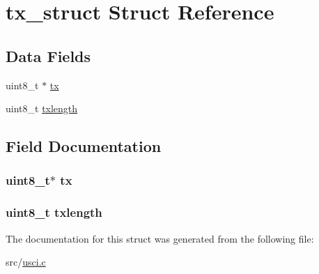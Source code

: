 \hypertarget{structtx__struct}{}\section{tx\+\_\+struct Struct Reference}
\label{structtx__struct}
\subsection*{Data Fields}
\begin{DoxyCompactItemize}
\item 
uint8\+\_\+t $\ast$ \hyperlink{structtx__struct_a9749a6866a8b0ea01498fb570e4d6b8a}{tx}
\item 
uint8\+\_\+t \hyperlink{structtx__struct_afe7c07919cd328be01c9d442f28f339e}{txlength}
\end{DoxyCompactItemize}


\subsection{Field Documentation}
\subsubsection[{\texorpdfstring{tx}{tx}}]{\setlength{\rightskip}{0pt plus 5cm}uint8\+\_\+t$\ast$ tx}\hypertarget{structtx__struct_a9749a6866a8b0ea01498fb570e4d6b8a}{}\label{structtx__struct_a9749a6866a8b0ea01498fb570e4d6b8a}
\subsubsection[{\texorpdfstring{txlength}{txlength}}]{\setlength{\rightskip}{0pt plus 5cm}uint8\+\_\+t txlength}\hypertarget{structtx__struct_afe7c07919cd328be01c9d442f28f339e}{}\label{structtx__struct_afe7c07919cd328be01c9d442f28f339e}


The documentation for this struct was generated from the following file\+:\begin{DoxyCompactItemize}
\item 
src/\hyperlink{usci_8c}{usci.\+c}\end{DoxyCompactItemize}
